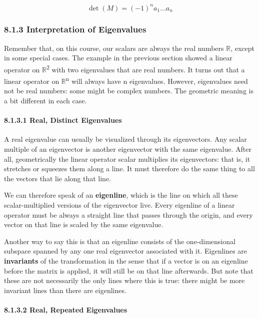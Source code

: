\documentclass[oneside,english]{amsbook}
\numberwithin{section}{chapter}
\theoremstyle{plain}
\theoremstyle{definition}
\begin{document}
\[\det(M) = ( - 1)^{n}a_{1}\ldots a_{n}\]

\subsubsection{8.1.3 Interpretation of
	Eigenvalues}\label{interpretation-of-eigenvalues}

Remember that, on this course, our scalars are always the real numbers
$\mathbb{R}$, except in some special cases. The example in the previous
section showed a linear operator on $\mathbb{R}$\textsuperscript{2} with
two eigenvalues that are real numbers. It turns out that a linear
operator on $\mathbb{R}$\textsuperscript{n} will always have n
eigenvalues. However, eigenvalues need not be real numbers: some might
be complex numbers. The geometric meaning is a bit different in each
case.

\paragraph{8.1.3.1 Real, Distinct
	Eigenvalues}\label{real-distinct-eigenvalues}

A real eigenvalue can usually be visualized through its eigenvectors.
Any scalar multiple of an eigenvector is another eigenvector with the
same eigenvalue. After all, geometrically the linear operator scalar
multiplies its eigenvectors: that is, it stretches or squeezes them
along a line. It must therefore do the same thing to all the vectors
that lie along that line.

We can therefore speak of an \textbf{eigenline}, which is the line on
which all these scalar-multiplied versions of the eigenvector live.
Every eigenline of a linear operator must be always a straight line that
passes through the origin, and every vector on that line is scaled by
the same eigenvalue.

Another way to say this is that an eigenline consists of the
one-dimensional subspace spanned by any one real eigenvector associated
with it. Eigenlines are \textbf{invariants} of the transformation in the
sense that if a vector is on an eigenline before the matrix is applied,
it will still be on that line afterwards. But note that these are not
necessarily the only lines where this is true: there might be more
invariant lines than there are eigenlines.

\paragraph{8.1.3.2 Real, Repeated
	Eigenvalues}\label{real-repeated-eigenvalues}
\end{document}
